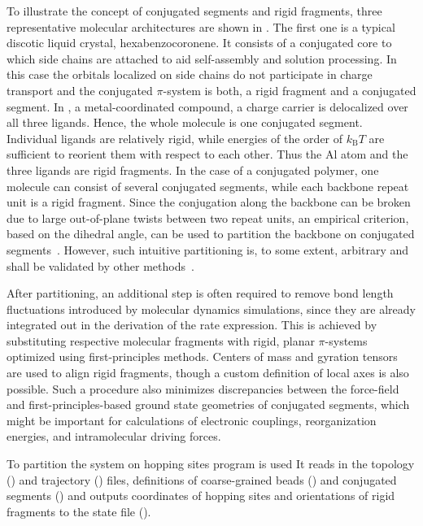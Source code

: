 To illustrate the concept of conjugated segments and rigid fragments, three representative molecular architectures are shown in . The first one is a typical discotic liquid crystal, hexabenzocoronene. It consists of a conjugated core to which side chains are attached to aid self-assembly and solution processing. In this case the orbitals localized on side chains do not participate in charge transport and the conjugated $\pi$-system is both, a rigid fragment and a conjugated segment. 
%
In \Alq, a metal-coordinated compound, a charge carrier is delocalized over all three ligands. Hence, the whole molecule is one conjugated segment. Individual ligands are relatively rigid, while energies of the order of $k_\text{B}T$ are sufficient to reorient them with respect to each other. Thus the Al atom and the three ligands are rigid fragments.
%
In the case of a conjugated polymer, one molecule can consist of several conjugated segments, while each backbone repeat unit is a rigid fragment. Since the conjugation along the backbone can be broken due to large out-of-plane twists between two repeat units, an empirical criterion, based on the dihedral angle, can be used to partition the backbone on conjugated segments~\cite{ruhle_multiscale_2010}. However, such intuitive partitioning is, to some extent, arbitrary and shall be validated by other methods~\cite{vukmirovic_charge_2008,vukmirovic_charge_2009,mcmahon_ad_2009}. 

After partitioning, an additional step is often required to remove bond length fluctuations introduced by molecular dynamics simulations, since they are already integrated out in the derivation of the rate expression. This is achieved by substituting respective molecular fragments with  rigid, planar $\pi$-systems optimized using first-principles methods. Centers of mass and gyration tensors are used to align rigid fragments, though a custom definition of local axes is also possible. Such a procedure also minimizes discrepancies between the force-field and first-principles-based ground state geometries of conjugated segments, which might be important for calculations of electronic couplings, reorganization energies, and intramolecular driving forces. 

To partition the system on hopping sites \ctpmap program is used
\vskip 0.1cm
{\noindent \small \ctpmap \tpl \topology \trj \trajectory \csg \xmlcsg \seg \xmlsegments  \sql \sqlstate}
\vskip 0.1cm
It reads in the \gromacs topology (\topology) and trajectory (\trajectory) files, definitions of coarse-grained beads (\xmlcsg) and conjugated segments (\xmlsegments) and outputs coordinates of hopping sites and orientations of rigid fragments to the  state file (\sqlstate).

